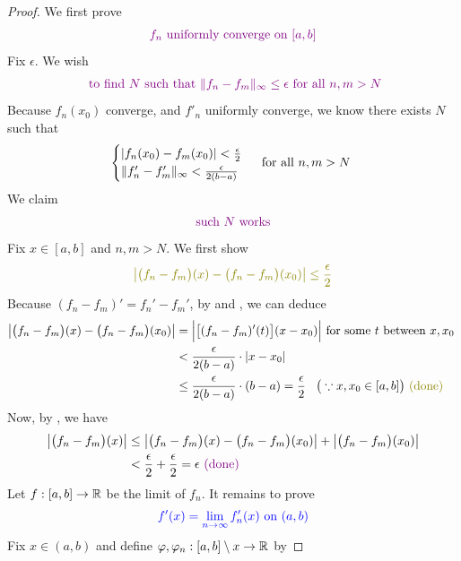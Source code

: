 \documentclass{report}
\begin{document}
\begin{proof}
We first prove 
\begin{align}
\label{fnun}
\textcolor{violet}{f_n\text{ uniformly converge on $[a,b]$}}
\end{align}
Fix $\epsilon $. We wish  
\begin{align*}
  \textcolor{violet}{\text{ to find $N$ such that $\| f_n-f_m \|_\infty \leq \epsilon $ for all $n,m>N$}}
\end{align*}
Because $f_n(x_0)$ converge, and $f'_n$ uniformly converge, we know there exists $N$ such that 
 \begin{align}
\label{UCD1}
\begin{cases}
 \left|f_n(x_0)-f_m(x_0)\right|<\frac{\epsilon}{2} \\
\| f_n'-f_m' \|_\infty <\frac{\epsilon }{2(b-a)}
\end{cases}\text{ for all $n,m>N$ }
\end{align}
We claim 
\begin{align*}
\textcolor{violet}{\text{ such $N$ works }}
\end{align*}
Fix $x \in [a,b]$ and $n,m>N$. We first show
\begin{align*}
\olive{\abso{\big(f_n-f_m\big)(x)-\big(f_n-f_m \big)(x_0)}\leq \frac{\epsilon}{2}}
\end{align*}
Because $(f_n-f_m)'=f_n'-f_m'$, by  and , we can deduce 
\begin{align*}
 \abso{\big(f_n-f_m\big)(x)-\big(f_n-f_m \big)(x_0)}&=\Big|\big[(f_n-f_m)'(t)\big](x-x_0)\Big|\text{ for some $t$ between $x,x_0$ }\\
 &< \frac{\epsilon}{2(b-a)}\cdot \abso{x-x_0}\\
 &\leq \frac{\epsilon }{2(b-a)}\cdot (b-a)=\frac{\epsilon}{2}\hspace{0.3cm}\big(\because x,x_0  \in [a,b]\big)\odone
\end{align*}
Now, by , we have 
\begin{align*}
  \left|\big(f_n-f_m \big)(x)\right|&\leq \left|\big(f_n-f_m \big)(x)-\big(f_n-f_m \big)(x_0)\right|+\left|\big(f_n-f_m \big)(x_0)\right|\\
&<\frac{\epsilon}{2}+\frac{\epsilon}{2}=\epsilon \textcolor{violet}{\text{ (done) }}
\end{align*}
Let $f:[a,b]\rightarrow \mathbb{R}$ be the limit of $f_n$. It remains to prove
\begin{align}
\label{UCAC2}
\textcolor{blue}{f'(x)=\lim_{n\to \infty}f_n'(x)\text{ on }(a,b)}
\end{align}
Fix $x\in (a,b)$ and define $\varphi ,\varphi_n:[a,b]\setminus x\rightarrow \mathbb{R}$ by 

\end{proof}
\end{document}

